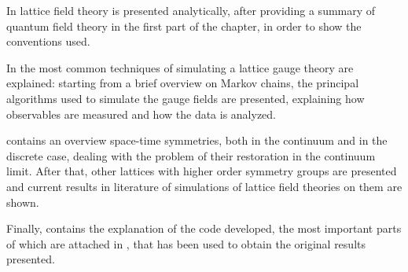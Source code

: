 In  lattice field theory is presented analytically, after providing a summary of quantum field theory in the first part of the chapter, in order to show the conventions used.

In  the most common techniques of simulating a lattice gauge theory are explained: starting from a brief overview on Markov chains, the principal algorithms used to simulate the gauge fields are presented, explaining how observables are measured and how the data is analyzed.

 contains an overview space-time symmetries, both in the continuum and in the discrete case, dealing with the problem of their restoration in the continuum limit.
After that, other lattices with higher order symmetry groups are presented and current results in literature of simulations of lattice field theories on them are shown.

Finally,  contains the explanation of the code developed, the most important parts of which are attached in , that has been used to obtain the original results presented.
